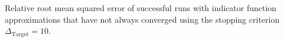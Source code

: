 Relative root mean squared error of successful runs with indicator function approximations that have not always converged using the stopping criterion $\Delta_{\text{Target}} = 10$.